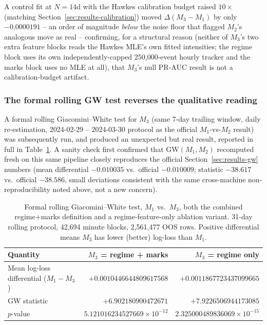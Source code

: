 A control fit at $N=14$d with the Hawkes calibration budget raised
$10\times$ (matching Section~\ref{sec:results-calibration}) moved
$\Delta(M_3-M_1)$ by only $-0.0000191$ -- an order of magnitude
\emph{below} the noise floor that flagged $M_2$'s analogous move as real
-- confirming, for a structural reason (neither of $M_3$'s two extra
feature blocks reads the Hawkes MLE's own fitted intensities; the regime
block uses its own independently-capped 250{,}000-event hourly tracker and
the marks block uses no MLE at all), that $M_3$'s null PR-AUC result is
not a calibration-budget artifact.

\subsubsection{The formal rolling GW test reverses the qualitative reading}
\label{sec:results-m3-gw}

A formal rolling Giacomini--White test for $M_3$ (same 7-day trailing
window, daily re-estimation, 2024-02-29 -- 2024-03-30 protocol as the
official $M_1$-vs-$M_2$ result) was subsequently run, and produced an
unexpected but real result, reported in full in
Table~\ref{tab:m3-gw}. A sanity check first confirmed that $\mathrm{GW}(M_1,M_2)$
recomputed fresh on this same pipeline closely reproduces the official
Section~\ref{sec:results-gw} numbers (mean differential $-0.010035$ vs.\
official $-0.010009$; statistic $-38.617$ vs.\ official $-38.586$, small
deviations consistent with the same cross-machine non-reproducibility
noted above, not a new concern).

\begin{table}[htbp]
\centering
\caption{Formal rolling Giacomini--White test, $M_1$ vs.\ $M_3$, both the
combined regime+marks definition and a regime-feature-only ablation
variant. 31-day rolling protocol, 42{,}694 minute blocks, 2{,}561{,}477
OOS rows. Positive differential means $M_3$ has lower (better) log-loss
than $M_1$.}
\label{tab:m3-gw}
\begin{tabular}{@{}lrr@{}}
\toprule
Quantity & $M_3$ = regime + marks & $M_3$ = regime only \\
\midrule
Mean log-loss differential ($M_1 - M_3$) & $+0.0010446644809617568$ & $+0.0011867723437099665$ \\
GW statistic & $+6.902180900472671$ & $+7.9226506944173085$ \\
$p$-value & $5.121016234527669 \times 10^{-12}$ & $2.325000489836069 \times 10^{-15}$ \\
\bottomrule
\end{tabular}
\end{table}

